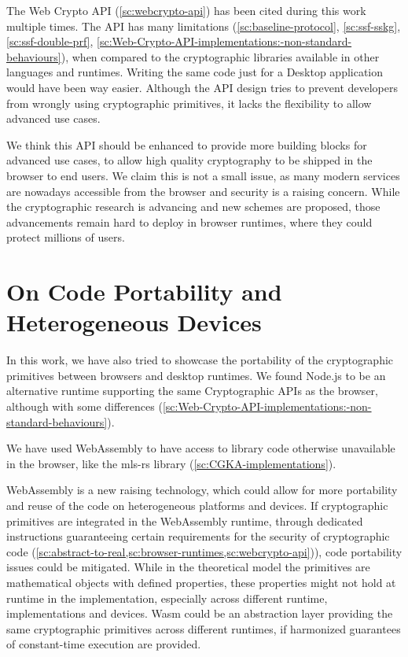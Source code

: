 The Web Crypto API (\cref{sc:webcrypto-api})
has been cited during this work
multiple times. 
The API has many limitations 
(\cref{sc:baseline-protocol}, \cref{sc:ssf-sskg}, \cref{sc:ssf-double-prf}, \cref{sc:Web-Crypto-API-implementations:-non-standard-behaviours}),
when compared to the cryptographic libraries available
in other languages and runtimes.
Writing the same code just for a Desktop application
would have been way easier.
Although the API design tries to prevent developers from
wrongly using cryptographic primitives, it lacks
the flexibility to allow advanced use cases.

We think this API should
be enhanced to provide more building blocks
for advanced use cases, to allow high quality
cryptography to be shipped in the browser to
end users. We claim this is not a small issue,
as many modern services are nowadays accessible
from the browser and security is a raising concern.
While the cryptographic research is advancing and new
schemes are proposed, those advancements remain hard to
deploy in browser runtimes, where they could 
protect millions of users.

\section{On Code Portability and Heterogeneous Devices}\label{sc:gap-code-portability}

In this work, we have also tried to showcase the
portability of the cryptographic primitives
between browsers and desktop runtimes.
We found Node.js to be an alternative runtime supporting
the same Cryptographic APIs as the browser, although
with some differences (\cref{sc:Web-Crypto-API-implementations:-non-standard-behaviours}).

We have used WebAssembly to have access to
library code otherwise unavailable
in the browser, like the mls-rs library
(\cref{sc:CGKA-implementations}). 

WebAssembly is a new raising technology, which could
allow for more portability and reuse of the code on
heterogeneous platforms and devices. 
If cryptographic primitives
are integrated in the WebAssembly runtime,
through dedicated instructions guaranteeing
certain requirements for the security of cryptographic
code (\cref{sc:abstract-to-real,sc:browser-runtimes,sc:webcrypto-api})),
code portability issues could be mitigated.
While in the theoretical model the primitives are
mathematical objects with defined properties,
these properties might not hold at runtime in the
implementation, especially across different runtime,
implementations and devices.
Wasm could be an abstraction layer providing the
same cryptographic primitives across different
runtimes, if harmonized guarantees of constant-time
execution are provided.


